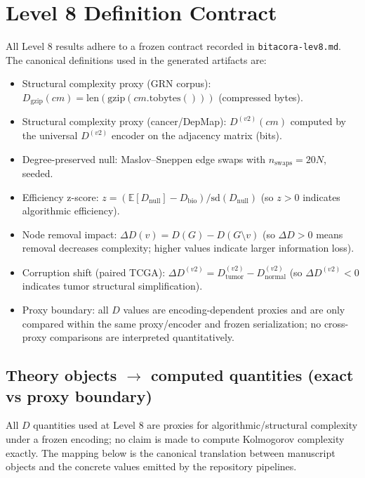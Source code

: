 \documentclass[11pt]{article}
\begin{document}
\section*{Level 8 Definition Contract}
All Level 8 results adhere to a frozen contract recorded in \texttt{bitacora-lev8.md}. The canonical definitions used in the generated artifacts are:
\begin{itemize}
    \item Structural complexity proxy (GRN corpus): $D_{\mathrm{gzip}}(cm) = \mathrm{len}(\mathrm{gzip}(cm.\mathrm{tobytes}()))$ (compressed bytes).
    \item Structural complexity proxy (cancer/DepMap): $D^{(v2)}(cm)$ computed by the universal $D^{(v2)}$ encoder on the adjacency matrix (bits).
    \item Degree-preserved null: Maslov--Sneppen edge swaps with $n_{\mathrm{swaps}} = 20N$, seeded.
    \item Efficiency z-score: $z = (\mathbb{E}[D_{\mathrm{null}}] - D_{\mathrm{bio}})/\mathrm{sd}(D_{\mathrm{null}})$ (so $z>0$ indicates algorithmic efficiency).
    \item Node removal impact: $\Delta D(v) = D(G) - D(G\setminus v)$ (so $\Delta D>0$ means removal decreases complexity; higher values indicate larger information loss).
    \item Corruption shift (paired TCGA): $\Delta D^{(v2)} = D^{(v2)}_{\mathrm{tumor}} - D^{(v2)}_{\mathrm{normal}}$ (so $\Delta D^{(v2)}<0$ indicates tumor structural simplification).
    \item Proxy boundary: all $D$ values are encoding-dependent proxies and are only compared within the same proxy/encoder and frozen serialization; no cross-proxy comparisons are interpreted quantitatively.
\end{itemize}

\subsection*{Theory objects $\rightarrow$ computed quantities (exact vs proxy boundary)}
All $D$ quantities used at Level 8 are proxies for algorithmic/structural complexity under a frozen encoding; no claim is made to compute Kolmogorov complexity exactly. The mapping below is the canonical translation between manuscript objects and the concrete values emitted by the repository pipelines.
\end{document}
